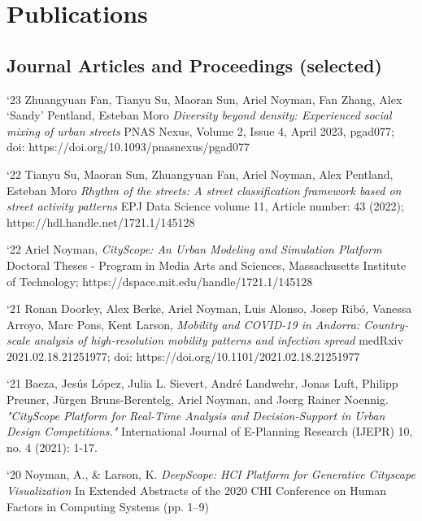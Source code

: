 \section*{Publications}

\subsection*{Journal Articles and Proceedings (selected)}

\begin{tablist}

    \item[`23] \tab
    Zhuangyuan Fan, Tianyu Su, Maoran Sun, Ariel Noyman, Fan Zhang, Alex ‘Sandy’ Pentland, Esteban Moro
    \textit{Diversity beyond density: Experienced social mixing of urban streets}
    PNAS Nexus, Volume 2, Issue 4, April 2023, pgad077; doi: https://doi.org/10.1093/pnasnexus/pgad077

    \item[`22] \tab
    Tianyu Su, Maoran Sun, Zhuangyuan Fan, Ariel Noyman, Alex Pentland, Esteban Moro
    \textit{Rhythm of the streets: A street classification framework based on street activity patterns}
    EPJ Data Science volume 11, Article number: 43 (2022); https://hdl.handle.net/1721.1/145128


    \item[`22] \tab
    Ariel Noyman, 
    \textit{CityScope: An Urban Modeling and Simulation Platform}
    Doctoral Theses - Program in Media Arts and Sciences, 
    Massachusetts Institute of Technology; https://dspace.mit.edu/handle/1721.1/145128
    
    \item[`21] \tab
    Ronan Doorley, Alex Berke, Ariel Noyman, Luis Alonso, Josep Ribó, Vanessa Arroyo, Marc Pons, Kent Larson,
    \textit{Mobility and COVID-19 in Andorra: Country-scale analysis of high-resolution mobility patterns and infection spread}
    medRxiv 2021.02.18.21251977; doi: https://doi.org/10.1101/2021.02.18.21251977


    \item[`21] \tab
    Baeza, Jesús López, Julia L. Sievert, André Landwehr, Jonas Luft, Philipp Preuner, Jürgen Bruns-Berentelg, Ariel Noyman, and Joerg Rainer Noennig. \textit{"CityScope Platform for Real-Time Analysis and Decision-Support in Urban Design Competitions."} International Journal of E-Planning Research (IJEPR) 10, no. 4 (2021): 1-17.


    \item[`20] \tab  Noyman, A., \& Larson, K.
    \textit{DeepScope: HCI Platform for Generative Cityscape Visualization
    }
    In Extended Abstracts of the 2020 CHI Conference on Human Factors in Computing Systems (pp. 1–9)


\end{tablist}
